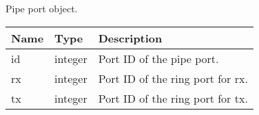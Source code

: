 \documentclass[a4paper,11pt,openany,oneside,english]{sphinxmanual}
\begin{document}
Pipe port object.


\begin{savenotes}\sphinxattablestart
\centering
{}
\sphinxthecaptionisattop
{}\label{\detokenize{api_ref/spp_primary:id36}}\label{\detokenize{api_ref/spp_primary:table-spp-ctl-primary-status-pipe}}
\sphinxaftertopcaption
\begin{tabulary}{\linewidth}[t]{|T|T|T|}
\hline
\sphinxstyletheadfamily 
Name
&\sphinxstyletheadfamily 
Type
&\sphinxstyletheadfamily 
Description
\\
\hline
id
&
integer
&
Port ID of the pipe port.
\\
\hline
rx
&
integer
&
Port ID of the ring port for rx.
\\
\hline
tx
&
integer
&
Port ID of the ring port for tx.
\\
\hline
\end{tabulary}
\par
\sphinxattableend\end{savenotes}
\end{document}
